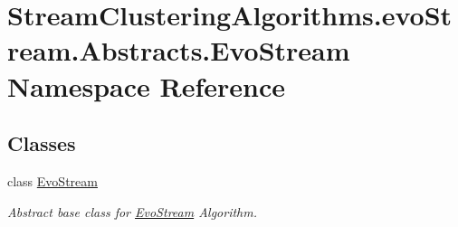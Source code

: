 \hypertarget{namespaceStreamClusteringAlgorithms_1_1evoStream_1_1Abstracts_1_1EvoStream}{}\section{Stream\+Clustering\+Algorithms.\+evo\+Stream.\+Abstracts.\+Evo\+Stream Namespace Reference}
\label{namespaceStreamClusteringAlgorithms_1_1evoStream_1_1Abstracts_1_1EvoStream}
\subsection*{Classes}
\begin{DoxyCompactItemize}
\item 
class \hyperlink{classStreamClusteringAlgorithms_1_1evoStream_1_1Abstracts_1_1EvoStream_1_1EvoStream}{Evo\+Stream}
\begin{DoxyCompactList}\small\item\em Abstract base class for \hyperlink{classStreamClusteringAlgorithms_1_1evoStream_1_1Abstracts_1_1EvoStream_1_1EvoStream}{Evo\+Stream} Algorithm. \end{DoxyCompactList}\end{DoxyCompactItemize}
